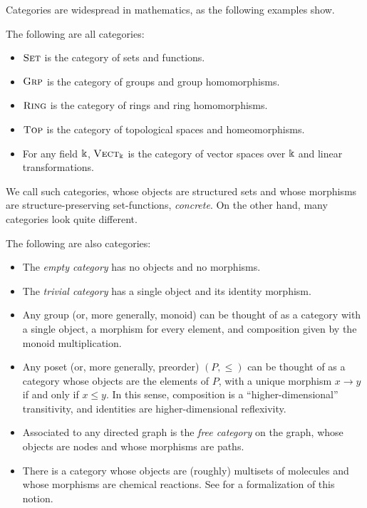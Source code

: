 \noindent
Categories are widespread in mathematics, as the following examples show.

\begin{ex}\label{ex:concrete categories}The following are all categories:
	\begin{itemize}
		\item ${\textsc{\text{Set}}}$ is the category of sets and functions.
		\item ${\textsc{\text{Grp}}}$ is the category of groups and group homomorphisms.
		\item ${\textsc{\text{Ring}}}$ is the category of rings and ring homomorphisms.
		\item ${\textsc{\text{Top}}}$ is the category of topological spaces and homeomorphisms.
		\item For any field $\Bbbk$, ${\textsc{\text{Vect}}}_\Bbbk$ is the category of vector
		      spaces over $\Bbbk$ and linear transformations.
	\end{itemize}
\end{ex}

\noindent
We call such categories, whose objects are structured sets and whose morphisms
are structure-preserving set-functions, \emph{concrete}. On the other hand, many
categories look quite different.

\begin{ex}\label{ex:abstract categories}The following are also categories:
	\begin{itemize}
		\item The \emph{empty category} has no objects and no morphisms.
		\item The \emph{trivial category} has a single object and its identity morphism.
		\item Any group (or, more generally, monoid) can be thought of as a category
		      with a single object, a morphism for every element, and composition
		      given by the monoid multiplication.
		\item Any poset (or, more generally, preorder) $(P, \leq)$ can be thought
		      of as a category whose objects are the elements of $P$, with a unique
		      morphism $x\rightarrow y$ if and only if $x\leq y$. In this sense,
		      composition is a ``higher-dimensional'' transitivity, and identities are
		      higher-dimensional reflexivity.
		\item Associated to any directed graph is the \emph{free category} on the
		      graph, whose objects are nodes and whose morphisms are paths.
		\item There is a category whose objects are (roughly) multisets of molecules
		      and whose morphisms are chemical reactions. See \cite{baez-2017} for a
		      formalization of this notion.
	\end{itemize}
\end{ex}

